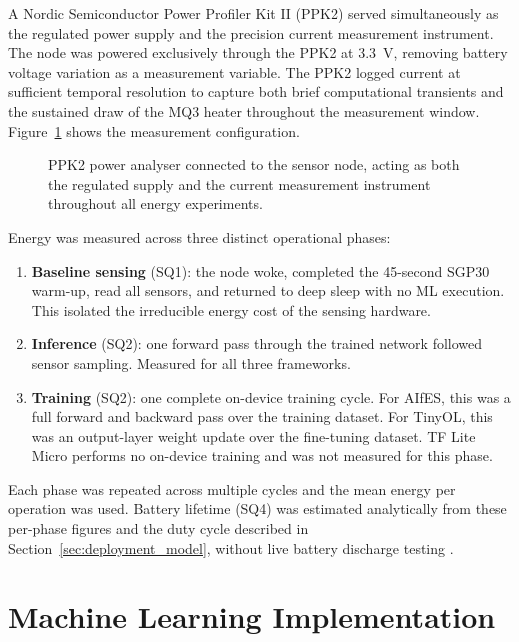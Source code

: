 A Nordic Semiconductor Power Profiler Kit II (PPK2) served simultaneously as the regulated power supply and the precision current measurement instrument. The node was powered exclusively through the PPK2 at \SI{3.3}{\volt}, removing battery voltage variation as a measurement variable. The PPK2 logged current at sufficient temporal resolution to capture both brief computational transients and the sustained draw of the MQ3 heater throughout the measurement window. Figure~\ref{fig:ppk2_setup} shows the measurement configuration.

\begin{figure}[H]
    \centering
    \caption{PPK2 power analyser connected to the sensor node, acting as both the regulated supply and the current measurement instrument throughout all energy experiments.}
    \label{fig:ppk2_setup}
\end{figure}

Energy was measured across three distinct operational phases:

\begin{enumerate}
    \item \textbf{Baseline sensing} (SQ1): the node woke, completed the 45-second SGP30 warm-up, read all sensors, and returned to deep sleep with no ML execution. This isolated the irreducible energy cost of the sensing hardware.
    \item \textbf{Inference} (SQ2): one forward pass through the trained network followed sensor sampling. Measured for all three frameworks.
    \item \textbf{Training} (SQ2): one complete on-device training cycle. For AIfES, this was a full forward and backward pass over the training dataset. For TinyOL, this was an output-layer weight update over the fine-tuning dataset. TF Lite Micro performs no on-device training and was not measured for this phase.
\end{enumerate}

Each phase was repeated across multiple cycles and the mean energy per operation was used. Battery lifetime (SQ4) was estimated analytically from these per-phase figures and the duty cycle described in Section~\ref{sec:deployment_model}, without live battery discharge testing \cite{Rodrigues2017}.

\section{Machine Learning Implementation}

